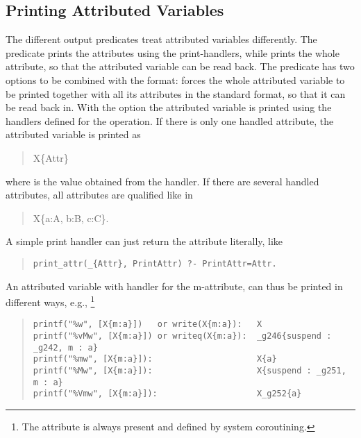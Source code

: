 \subsection{Printing Attributed Variables}
The different output predicates treat attributed variables differently.
The  predicate prints
the attributes using the print-handlers,
while  prints the whole
attribute, so that the attributed variable
can be read back.
The  predicate has two
options to be combined with
the  format:  forces the whole attributed variable to be
printed
together with all its attributes in the standard format, so that
it can be read back in.
With the  option the attributed variable is printed using the
handlers
defined for the  operation.
If there is only one handled attribute, the attributed variable is printed as
\begin{quote}
X\{Attr\}
\end{quote}
where  is the value obtained from the handler.
If there are several handled attributes, all attributes are qualified
like in
\begin{quote}
X\{a:A, b:B, c:C\}.
\end{quote}
A simple print handler can just return the attribute literally, like
\begin{quote}\begin{verbatim}
print_attr(_{Attr}, PrintAttr) ?- PrintAttr=Attr.
\end{verbatim}\end{quote}
{\samepage
An attributed variable  with  handler
for the m-attribute, can thus be printed in different ways, e.g.,
\footnote{The attribute  is always present and defined
by system coroutining.}
\begin{quote}
\begin{verbatim}
printf("%w", [X{m:a}])   or write(X{m:a}):   X
printf("%vMw", [X{m:a}]) or writeq(X{m:a}):  _g246{suspend : _g242, m : a}
printf("%mw", [X{m:a}]):                     X{a}
printf("%Mw", [X{m:a}]):                     X{suspend : _g251, m : a}
printf("%Vmw", [X{m:a}]):                    X_g252{a}
\end{verbatim}
\end{quote}
}

